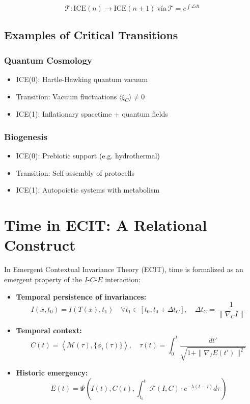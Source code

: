 \documentclass{article}
\begin{document}
\begin{equation}\label{eq:ari-ecitplus}
\mathcal{T}: \text{ICE}(n) \to \text{ICE}(n+1)\ \text{vía}\ \mathcal{T} = e^{\int \mathcal{L} dt}
\end{equation}

\subsection{Examples of Critical Transitions}
\label{subsec:ejemplos}

\subsubsection{Quantum Cosmology}
\begin{itemize}
\item ICE(0): Hartle-Hawking quantum vacuum
\item Transition: Vacuum fluctuations $\langle \xi_C \rangle \neq 0$
\item ICE(1): Inflationary spacetime + quantum fields
\end{itemize}

\subsubsection{Biogenesis}
\begin{itemize}
\item ICE(0): Prebiotic support (e.g. hydrothermal)
\item Transition: Self-assembly of protocells
\item ICE(1): Autopoietic systems with metabolism
\end{itemize}


\section{Time in ECIT: A Relational Construct}

In Emergent Contextual Invariance Theory (ECIT), time is formalized as an emergent property of the $I$-$C$-$E$ interaction:
\begin{itemize}
\item \textbf{Temporal persistence of invariances:}
\begin{equation}
I(x,t_0) = I(T(x),t_1) \quad \forall t_1 \in [t_0, t_0 + \Delta t_C], \quad \Delta t_C = \frac{1}{\|\nabla_C I\|}
\end{equation}

\item \textbf{Temporal context:}
\begin{equation}
C(t) = \left\langle \mathcal{M}(\tau), \{\phi_i(\tau)\} \right\rangle, \quad \tau(t) = \int_0^t \frac{dt'}{\sqrt{1 + \|\nabla_I E(t')\|^2}}
\end{equation}

\item \textbf{Historic emergency:}
\begin{equation}
E(t) = \Psi\left(I(t), C(t), \int_{t_0}^t \mathcal{F}(I,C) \cdot e^{-\lambda(t-\tau)} d\tau \right)
\end{equation}
\end{itemize}
\end{document}
